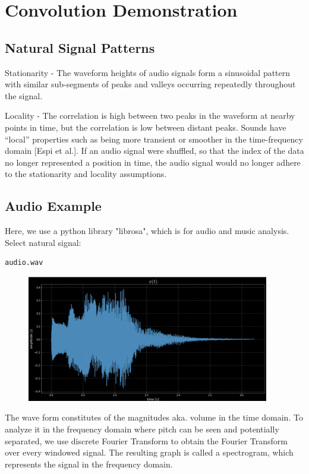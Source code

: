 \chapter{Convolution Demonstration}
\s
\section{Natural Signal Patterns}

Stationarity - The waveform heights of audio signals form a sinusoidal pattern with similar
sub-segments of peaks and valleys occurring repeatedly throughout the signal.

Locality - The correlation is high between two peaks in the waveform at nearby points in time, but the correlation is low between distant peaks. Sounds have “local” properties such as being more transient or smoother in the time-frequency domain [Espi et al.]. If an audio signal were shuffled, so that the index of the data no longer represented a position in time, the audio signal would no
longer adhere to the stationarity and locality assumptions.



\section{Audio Example}
Here, we use a python library "librosa", which is for audio and music analysis. Select natural signal: \begin{verbatim}audio.wav\end{verbatim}

\begin{figure}[ht]
    \centering
    \includegraphics[width=300pt]{labs/04/images/1.png}
    \label{fig:waveform}
\end{figure}

The wave form constitutes of the magnitudes aka. volume in the time domain. To analyze it in the frequency domain where pitch can be seen and potentially separated, we use discrete Fourier Transform to obtain the Fourier Transform over every windowed signal. The resulting graph is called a spectrogram, which represents the signal in the frequency domain.

